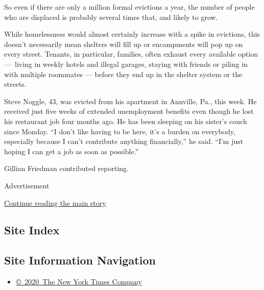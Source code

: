 So even if there are only a million formal evictions a year, the number
of people who are displaced is probably several times that, and likely
to grow.

While homelessness would almost certainly increase with a spike in
evictions, this doesn't necessarily mean shelters will fill up or
encampments will pop up on every street. Tenants, in particular,
families, often exhaust every available option ---~living in weekly
hotels and illegal garages, staying with friends or piling in with
multiple roommates --- before they end up in the shelter system or the
streets.

Steve Noggle, 43, was evicted from his apartment in Annville, Pa., this
week. He received just five weeks of extended unemployment benefits even
though he lost his restaurant job four months ago. He has been sleeping
on his sister's couch since Monday. ``I don't like having to be here,
it's a burden on everybody, especially because I can't contribute
anything financially,'' he said. ``I'm just hoping I can get a job as
soon as possible.''

Gillian Friedman contributed reporting.

Advertisement

\protect\hyperlink{after-bottom}{Continue reading the main story}

\hypertarget{site-index}{%
\subsection{Site Index}\label{site-index}}

\hypertarget{site-information-navigation}{%
\subsection{Site Information
Navigation}\label{site-information-navigation}}

\begin{itemize}
\tightlist
\item
  \href{https://help.nytimes.com/hc/en-us/articles/115014792127-Copyright-notice}{©~2020~The
  New York Times Company}
\end{itemize}

